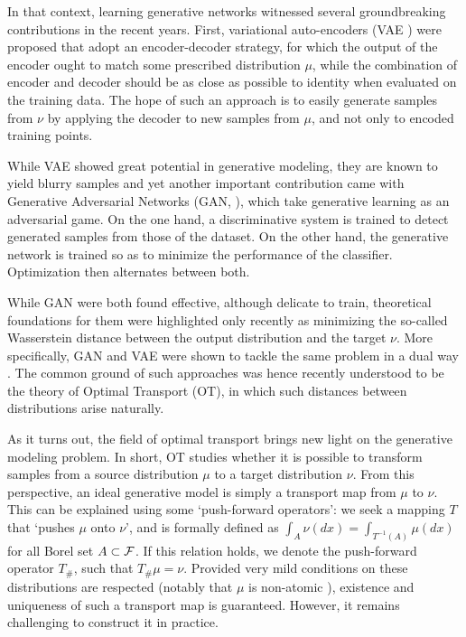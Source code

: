 In that context, learning generative networks witnessed several groundbreaking contributions in the recent years. First, variational auto-encoders (VAE \cite{kingma2013VAE}) were proposed that adopt an encoder-decoder strategy, for which the output of the encoder ought to match some prescribed distribution $\mu$, while the combination of encoder and decoder should be as close as possible to identity when evaluated on the training data. The hope of such an approach is to easily generate samples from $\nu$ by applying the decoder to new samples from $\mu$, and not only to encoded training points.%

While VAE showed great potential in generative modeling, they are known to yield blurry samples and yet another important contribution came with Generative Adversarial Networks (GAN, \cite{goodfellow2014generative,salimans2016improved,eghbal2017probabilistic}), which take generative learning as an adversarial game. On the one hand, a discriminative system is trained to detect generated samples from those of the dataset. On the other hand, the generative network is trained so as to minimize the performance of the classifier. Optimization then alternates between both.


While GAN were both found effective, although delicate to train, theoretical foundations for them were highlighted only recently \cite{bousquet2017optimal} as minimizing the so-called Wasserstein distance between the output distribution and the target $\nu$. More specifically, GAN and VAE were shown to tackle the same problem in a dual way \cite{bousquet2017optimal,genevay2017gan}. The common ground of such approaches was hence recently understood to be the theory of Optimal Transport (OT), in which such distances between distributions arise naturally.

As it turns out, the field of optimal transport brings new light on the generative modeling problem. In short, OT studies whether it is possible to transform samples from a source distribution $\mu$ to a target distribution $\nu$. From this perspective, an ideal generative model is simply a transport map from $\mu$ to $\nu$.
%
This can be explained using some `push-forward operators': we seek a mapping $T$ that `pushes $\mu$ onto $\nu$', and is formally defined as $\int_A \nu(dx) = \int_{T^{-1}(A)} \mu(dx) $ for all Borel set $A \subset \mathcal{F}$. If this relation holds, we denote the push-forward operator $T_\#$, such that $T_\# \mu = \nu$. Provided very mild conditions on these distributions are respected (notably that $\mu$ is non-atomic \cite{villani2008optimal}), existence and uniqueness of such a transport map is guaranteed. However, it remains challenging to construct it in practice.

